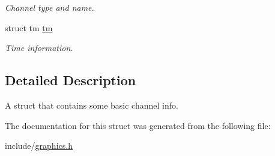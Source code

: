 \begin{DoxyCompactItemize}
\begin{DoxyCompactList}\small\item\em Channel type and name. \end{DoxyCompactList}\item 
struct tm \hyperlink{structgraphics__channel__info_a6acd02cb8ba22b89c8f39caca2b69620}{tm}\hypertarget{structgraphics__channel__info_a6acd02cb8ba22b89c8f39caca2b69620}{}\label{structgraphics__channel__info_a6acd02cb8ba22b89c8f39caca2b69620}

\begin{DoxyCompactList}\small\item\em Time information. \end{DoxyCompactList}\end{DoxyCompactItemize}


\subsection{Detailed Description}
A struct that contains some basic channel info. 

The documentation for this struct was generated from the following file\+:\begin{DoxyCompactItemize}
\item 
include/\hyperlink{graphics_8h}{graphics.\+h}\end{DoxyCompactItemize}
